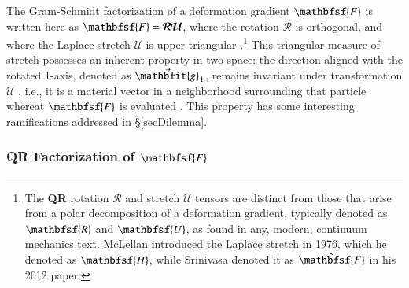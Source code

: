 The Gram-Schmidt factorization of a deformation gradient $\mathbfsf{F}$ is written here as $\mathbfsf{F} = \boldsymbol{\mathcal{RU}}$, where the rotation $\boldsymbol{\mathcal{R}}$ is orthogonal, and where the Laplace stretch $\boldsymbol{\mathcal{U}}$ is upper-triangular \cite{Freedetal19}.\footnote{
	The \textbf{QR} rotation $\boldsymbol{\mathcal{R}}$ and stretch $\boldsymbol{\mathcal{U}}$ tensors are distinct from those that arise from a polar decomposition of a deformation gradient, typically denoted as $\mathbfsf{R}$ and $\mathbfsf{U}$, as found in any, modern, continuum mechanics text.  McLellan \cite{McLellan76,McLellan80} introduced the Laplace stretch in 1976, which he denoted as $\mathbfsf{H}$, while Srinivasa \cite{Srinivasa12} denoted it as $\tilde{\mathbfsf{F}}$ in his 2012 paper.
} 
This triangular measure of stretch possesses an inherent property in two space: the direction aligned with the rotated 1-axis, denoted as $\vec{\mathbfit{g}}_{\hspace{0.5pt}1}$, remains invariant under transformation $\boldsymbol{\mathcal{U}}$ \cite{McLellan80}, i.e., it is a material vector in a neighborhood surrounding that particle whereat $\mathbfsf{F}$ is evaluated \cite{FreedZamani18}.  This property has some interesting ramifications addressed in \S\ref{secDilemma}.

\subsubsection{\textbf{QR} Factorization of\/ $\mathbfsf{F}$}

